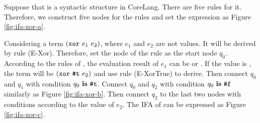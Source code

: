 Suppose that  is a syntactic structure in CoreLang. There are five rules for it. Therefore, we construct five nodes for the rules and set the expression as Figure \ref{fig:ifa-xor-a}.

Considering a term $(\mbox{\tt xor}~e_1~e_2)$, where $e_1$ and $e_2$ are not values. It will be derived by rule (E-Xor). Therefore, set the node of the rule as the start node $q_0$. According to the rules of , the evaluation result of $e_1$ can be  or . If the value is , the term will be $(\mbox{\tt xor}~\mbox{\tt \#t}~e_2)$ and use rule (E-XorTrue) to derive. Then connect $q_0$ and $q_1$ with condition $q_0~\mbox{\rm \bf is}~\mbox{\tt \#t}$. Connect $q_0$ and $q_2$ with condition $q_0~\mbox{\rm \bf is}~\mbox{\tt \#f}$ similarly as Figure \ref{fig:ifa-xor-b}. Then connect $q_2$ to the last two nodes with conditions according to the value of $e_2$. The IFA of  can be expressed as Figure \ref{fig:ifa-xor-c}.

